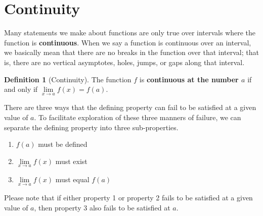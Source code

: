 \documentclass[10pt,oneside,]{book}
\newcommand{\terminology}[1]{\textbf{#1}}
\theoremstyle{plain}
\theoremstyle{definition}
\newtheorem{definition}[theorem]{Definition}
\numberwithin{equation}{section}
\newcommand{\fe}[2]{#1\mathopen{}\left(#2\right)\mathclose{}}
\begin{document}
\section[Continuity]{Continuity}\label{section-continuity}
Many statements we make about functions are only true over intervals where the function is \terminology{continuous}. When we say a function is continuous over an interval, we basically mean that there are no breaks in the function over that interval; that is, there are no vertical asymptotes, holes, jumps, or gaps along that interval.%
\begin{definition}[Continuity]\label{definition-continuity}
The function \(f\) is \terminology{continuous at the number \(a\)} if and only if \(\lim\limits_{x\to a}\fe{f}{x}=\fe{f}{a}\).%
\par
There are three ways that the defining property can fail to be satisfied at a given value of \(a\). To facilitate exploration of these three manners of failure, we can separate the defining property into three sub-properties.%
\begin{enumerate}
\item{}\(\fe{f}{a}\) must be defined\item{}\(\lim\limits_{x\to a}\fe{f}{x}\) must exist\item{}\(\lim\limits_{x\to a}\fe{f}{x}\) must equal \(\fe{f}{a}\)\end{enumerate}
\par
Please note that if either property 1 or property 2 fails to be satisfied at a given value of \(a\), then property 3 also fails to be satisfied at \(a\).%
\end{definition}
\typeout{************************************************}
\typeout{************************************************}
\end{document}
